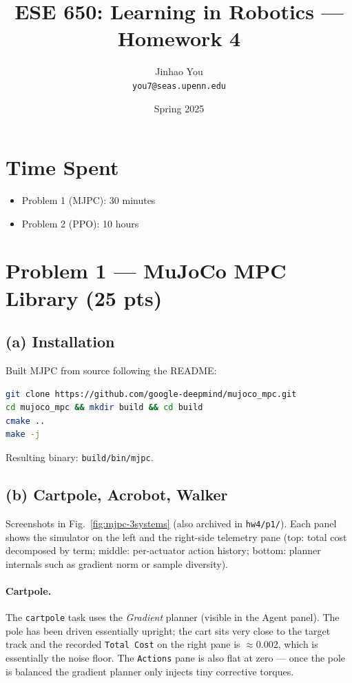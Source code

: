 \documentclass[11pt]{article}
\title{ESE 650: Learning in Robotics --- Homework 4}
\author{Jinhao You \\ \texttt{you7@seas.upenn.edu}}
\date{Spring 2025}
\begin{document}
\maketitle

\section*{Time Spent}
\begin{itemize}[leftmargin=*]
    \item Problem 1 (MJPC): 30 minutes
    \item Problem 2 (PPO): 10 hours
\end{itemize}

\section{Problem 1 --- MuJoCo MPC Library (25 pts)}

\subsection*{(a) Installation}
Built MJPC from source following the README:
\begin{lstlisting}[language=bash]
git clone https://github.com/google-deepmind/mujoco_mpc.git
cd mujoco_mpc && mkdir build && cd build
cmake ..
make -j
\end{lstlisting}
Resulting binary: \texttt{build/bin/mjpc}.

\subsection*{(b) Cartpole, Acrobot, Walker}
Screenshots in Fig.~\ref{fig:mjpc-3systems} (also archived in
\texttt{hw4/p1/}). Each panel shows the simulator on the left and the
right-side telemetry pane (top: total cost decomposed by term;
middle: per-actuator action history; bottom: planner internals such
as gradient norm or sample diversity).

\paragraph{Cartpole.} The \texttt{cartpole} task uses the
\emph{Gradient} planner (visible in the Agent panel). The pole has
been driven essentially upright; the cart sits very close to the
target track and the recorded \texttt{Total Cost} on the right pane
is $\approx 0.002$, which is essentially the noise floor. The
\texttt{Actions} pane is also flat at zero --- once the pole is
balanced the gradient planner only injects tiny corrective torques.
\end{document}
